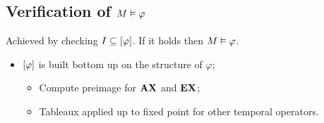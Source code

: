 \subsection{Verification of $M \vDash \varphi$}

Achieved by checking $I \subseteq \left[{\varphi}\right]$. If it holds then $M
\vDash \varphi$.
\begin{itemize}

\item   $\left[{\varphi}\right]$ is built bottom up on the structure of $\varphi$;

    \begin{itemize}

    \item   Compute preimage for $\AX$ and $\EX$;

    \item   Tableaux applied up to fixed point for other temporal
            operators.

    \end{itemize}

\end{itemize}

